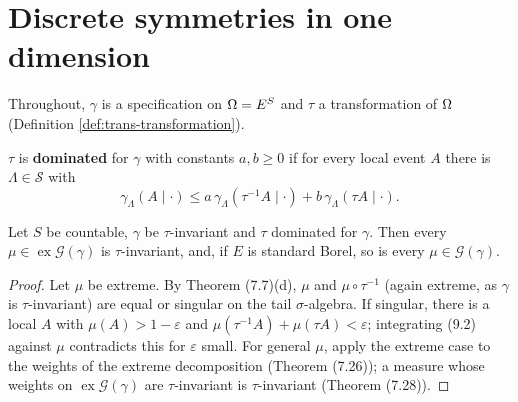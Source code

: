 \section{Discrete symmetries in one dimension}

Throughout, $\gamma$ is a specification on $\Omega = E^S$ and $\tau$ a transformation of $\Omega$
(Definition \ref{def:trans-transformation}).

\begin{definition}[Hypothesis (9.2)]
    \label{def:sb-dominated}
    \leanok

    $\tau$ is \textbf{dominated} for $\gamma$ with constants $a, b \geq 0$ if for every local event
    $A$ there is $\Lambda \in \mathcal S$ with
    \[
        \gamma_\Lambda(A \mid \cdot) \leq a\, \gamma_\Lambda(\tau^{-1} A \mid \cdot)
            + b\, \gamma_\Lambda(\tau A \mid \cdot) . \tag{9.2}
    \]
\end{definition}

\begin{proposition}[Georgii (9.1)]
    \label{prop:sb-9-1}
    \leanok

    Let $S$ be countable, $\gamma$ be $\tau$-invariant and $\tau$ dominated for $\gamma$. Then
    every $\mu \in \operatorname{ex} \mathcal G(\gamma)$ is $\tau$-invariant, and, if $E$ is
    standard Borel, so is every $\mu \in \mathcal G(\gamma)$.
\end{proposition}
\begin{proof}
    \leanok
    Let $\mu$ be extreme. By Theorem (7.7)(d), $\mu$ and $\mu \circ \tau^{-1}$ (again extreme, as
    $\gamma$ is $\tau$-invariant) are equal or singular on the tail $\sigma$-algebra. If singular,
    there is a local $A$ with $\mu(A) > 1 - \varepsilon$ and $\mu(\tau^{-1} A) + \mu(\tau A)
    < \varepsilon$; integrating (9.2) against $\mu$ contradicts this for $\varepsilon$ small.
    For general $\mu$, apply the extreme case to the weights of the extreme decomposition
    (Theorem (7.26)); a measure whose weights on $\operatorname{ex}\mathcal G(\gamma)$ are
    $\tau$-invariant is $\tau$-invariant (Theorem (7.28)).
\end{proof}

